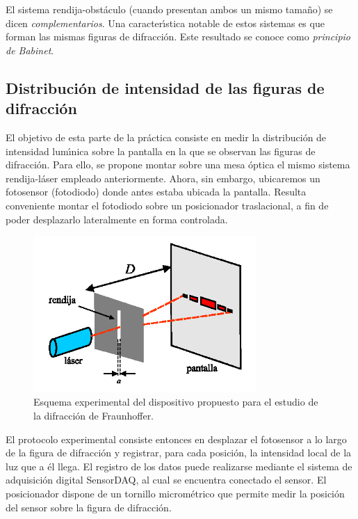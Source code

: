 \documentclass[laboratorio]{guia}
\begin{document}
El sistema rendija-obst\'aculo (cuando presentan ambos un mismo tama\~no) 
se dicen {\it complementarios}. Una caracter\'\i stica notable
de estos sistemas es que forman las mismas figuras de difracci\'on. Este 
resultado se conoce como {\it principio de Babinet}.

\subsection{Distribuci\'on de intensidad de las figuras de difracci\'on}

El objetivo de esta parte de la pr\'actica consiste en medir la distribuci\'on
de intensidad lum\'\i nica sobre la pantalla en la que se observan las 
figuras de difracci\'on. Para ello, se propone montar sobre una mesa \'optica
el mismo sistema rendija-l\'aser empleado anteriormente. Ahora, sin embargo,
ubicaremos un fotosensor (fotodiodo) donde antes estaba ubicada la pantalla. 
Resulta conveniente montar el fotodiodo sobre un posicionador traslacional, a
fin de poder desplazarlo lateralmente en forma controlada.

\begin{figure}[t!]
    \centering
    \includegraphics[width=8.5cm]{LG10--000.png}
    \caption{Esquema experimental del dispositivo propuesto para el 
    estudio de la difracci\'on de Fraunhoffer.}
    \label{fig:1}
\end{figure}

El protocolo experimental consiste entonces en desplazar el fotosensor a lo
largo de la figura de difracci\'on y registrar, para cada posici\'on, la
intensidad local de la luz que a \'el llega. El registro de los datos puede
realizarse mediante el sistema de adquisici\'on digital SensorDAQ, al cual
se encuentra conectado el sensor. El posicionador dispone de un tornillo 
microm\'etrico que permite medir la posici\'on del sensor sobre la figura
de difracci\'on. 
\end{document}
